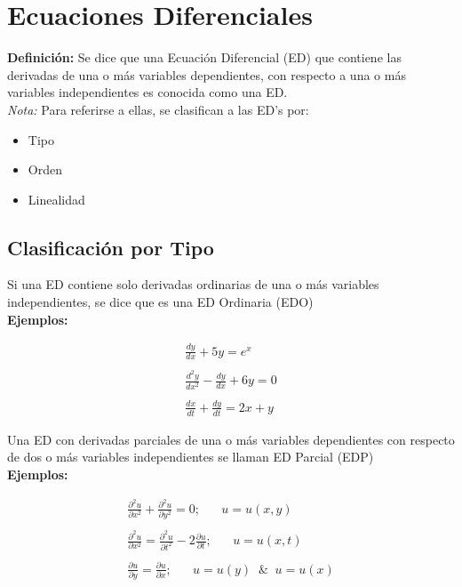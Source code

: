 \chapter{Ecuaciones Diferenciales}

\textbf{Definición:} Se dice que una Ecuación Diferencial (ED) que contiene las derivadas de una o más variables dependientes, con respecto a una o más variables independientes es conocida como una ED.\\

\textit{Nota:} Para referirse a ellas, se clasifican a las ED's por:

\begin{itemize}
  \item Tipo
  \item Orden
  \item Linealidad
\end{itemize}

\section{Clasificación por Tipo}

Si una ED contiene solo derivadas ordinarias de una o más variables independientes, se dice que es una ED Ordinaria (EDO)\\

\textbf{Ejemplos:}

\begin{equation*}
    \begin{gathered}
        \frac{dy}{dx}+5y=e^{x}\\\\
        \frac{d^{2}y}{dx^{2}}-\frac{dy}{dx}+6y=0\\\\
        \frac{dx}{dt}+\frac{dy}{dt}=2x+y
    \end{gathered}
\end{equation*}

Una ED con derivadas parciales de una o más variables dependientes con respecto de dos o más variables independientes se llaman ED Parcial (EDP)\\

\textbf{Ejemplos:}

\begin{equation*}
    \begin{gathered}
        \frac{\partial^{2}u}{\partial x^{2}}+\frac{\partial^{2}u}{\partial y^{2}}=0;\;\;\;\;\;\; u=u(x,y)\\\\
        \frac{\partial^{2}u}{\partial x^{2}}=\frac{\partial^{2}u}{\partial t^{2}}-2\frac{\partial u}{\partial t};\;\;\;\;\;\; u=u(x,t)\\\\
        \frac{\partial u}{\partial y}=\frac{\partial u}{\partial x}; \;\;\;\;\;\; u=u(y)\;\;\&\;\;u=u(x)
    \end{gathered}
\end{equation*}

